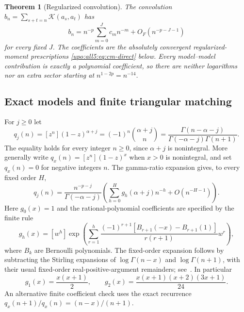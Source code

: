 \documentclass[11pt,letterpaper]{article}
\newtheorem{theorem}{Theorem}[section]
\theoremstyle{remark}\newtheorem{remark}[theorem]{Remark}
\numberwithin{equation}{section}
\begin{document}
\begin{theorem}[Regularized convolution]\label{upo:all5:thm:conv}
The convolution $b_n=\sum_{s+t=n}\mathcal K(a_s,a_t)$ has
\begin{equation}\label{upo:all5:eq:abstract-output}
 b_n=n^{-p}\sum_{m=0}^J c_m n^{-m}
                          +O_F(n^{-p-J-1})
\end{equation}
for every fixed $J$. The coefficients are the absolutely convergent
regularized-moment prescriptions \eqref{upo:all5:eq:cm-direct} below. Every
model--model contribution is exactly a polynomial coefficient, so
there are neither logarithms nor an extra sector starting at
$n^{1-2p}=n^{-14}$.
\end{theorem}

\subsection{Exact models and finite triangular matching}
For $j\ge0$ let
\begin{equation}\label{upo:all5:eq:q}
 q_j(n)=[z^n](1-z)^{\alpha+j}
       =(-1)^n\binom{\alpha+j}{n}
       =\frac{\Gamma(n-\alpha-j)}{\Gamma(-\alpha-j)\Gamma(n+1)}.
\end{equation}
The equality holds for every integer $n\ge0$, since $\alpha+j$
is nonintegral. More generally write $q_x(n)=[z^n](1-z)^x$ when
$x>0$ is nonintegral, and set $q_x(n)=0$ for negative integers $n$.
The gamma-ratio expansion gives, to every fixed order $H$,
\begin{equation}\label{upo:all5:eq:qexp}
 q_j(n)=\frac{n^{-p-j}}{\Gamma(-\alpha-j)}
       \left(\sum_{h=0}^H g_h(\alpha+j)n^{-h}
                                    +O(n^{-H-1})\right).
\end{equation}
Here $g_0(x)=1$ and the rational-polynomial coefficients are specified
by the finite rule
\begin{equation}\label{upo:all5:eq:g}
 g_h(x)=[w^h]\exp\left(
 \sum_{r=1}^h\frac{(-1)^{r+1}
       [B_{r+1}(-x)-B_{r+1}(1)]}{r(r+1)}w^r\right),
\end{equation}
where $B_k$ are Bernoulli polynomials. The fixed-order expansion
follows by subtracting the Stirling expansions of
$\log\Gamma(n-x)$ and $\log\Gamma(n+1)$, with their usual
fixed-order real-positive-argument remainders; see~\cite{DLMF}.
In particular
\[
 g_1(x)=\frac{x(x+1)}2,\qquad
 g_2(x)=\frac{x(x+1)(x+2)(3x+1)}{24}.
\]
An alternative finite coefficient check uses the exact recurrence
$q_x(n+1)/q_x(n)=(n-x)/(n+1)$.
\end{document}
